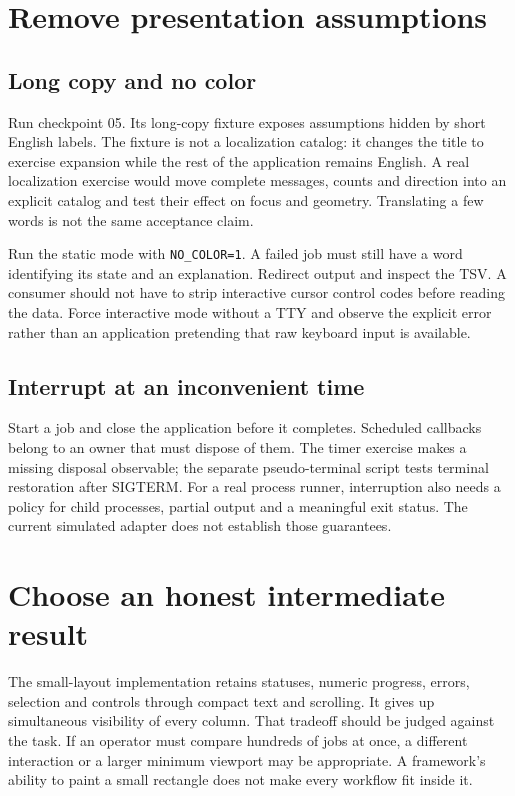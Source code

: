 \section{Remove presentation assumptions}

\subsection{Long copy and no color}

Run checkpoint 05. Its long-copy fixture exposes assumptions hidden by short English labels. The fixture is not a localization catalog: it changes the title to exercise expansion while the rest of the application remains English. A real localization exercise would move complete messages, counts and direction into an explicit catalog and test their effect on focus and geometry. Translating a few words is not the same acceptance claim.

Run the static mode with \texttt{NO\_COLOR=1}. A failed job must still have a word identifying its state and an explanation. Redirect output and inspect the TSV. A consumer should not have to strip interactive cursor control codes before reading the data. Force interactive mode without a TTY and observe the explicit error rather than an application pretending that raw keyboard input is available.

\subsection{Interrupt at an inconvenient time}

Start a job and close the application before it completes. Scheduled callbacks belong to an owner that must dispose of them. The timer exercise makes a missing disposal observable; the separate pseudo-terminal script tests terminal restoration after SIGTERM. For a real process runner, interruption also needs a policy for child processes, partial output and a meaningful exit status. The current simulated adapter does not establish those guarantees.

\section{Choose an honest intermediate result}

The small-layout implementation retains statuses, numeric progress, errors, selection and controls through compact text and scrolling. It gives up simultaneous visibility of every column. That tradeoff should be judged against the task. If an operator must compare hundreds of jobs at once, a different interaction or a larger minimum viewport may be appropriate. A framework's ability to paint a small rectangle does not make every workflow fit inside it.
